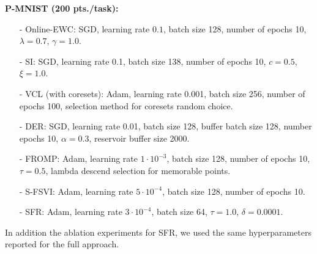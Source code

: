 \documentclass{article}
\newcommand{\mathbold}[1]{\bm{#1}}
\newcommand{\mbf}[1]{\mathbf{#1}}
\newcommand{\MB}{\mbf{B}}
\newcommand{\MZ}{\mbf{Z}}
\newcommand{\T}{\top}
\newcommand{\vbeta}[0]{\mathbold{\beta}}
\newcommand{\vu}{\mbf{u}}
\newcommand{\vw}{\mbf{w}}
\newcommand{\MKzz}{\mbf{K}_{\mbf{z}\mbf{z}}}
\begin{document}
\textbf{P-MNIST (200 pts./task):}
\begin{itemize}
	\item[-] Online-EWC: SGD, learning rate $0.1$, batch size 128, number of epochs 10, $\lambda=0.7$, $\gamma=1.0$.
	\item[-] SI: SGD, learning rate 0.1, batch size 138, number of epochs 10, $c=0.5$, $\xi=1.0$. 
	\item[-] VCL (with coresets): Adam, learning rate 0.001, batch size 256, number of epochs 100, selection method for coresets random choice.
	\item[-] DER:  SGD, learning rate 0.01, batch size 128, buffer batch size 128, number epochs 10, $\alpha=0.3$, reservoir buffer size 2000.
	\item[-] FROMP: Adam, learning rate $1 \cdot 10^{-3}$, batch size 128, number of epochs 10, $\tau = 0.5$, lambda descend selection for memorable points.
	\item[-] S-FSVI: Adam, learning rate $5 \cdot 10^{-4}$, batch size 128, number of epochs 10.
	\item[-] SFR: Adam, learning rate $3 \cdot 10^{-4}$, batch size 64, $\tau=1.0$, $\delta=0.0001$. 
\end{itemize}

In addition the ablation experiments for SFR, we used the same hyperparameters reported for the full approach.

%







%    


%
\end{document}
